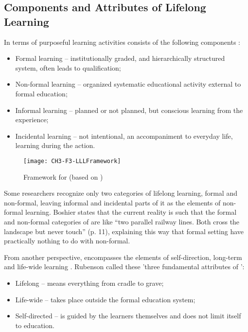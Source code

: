 \subsection{Components and Attributes of Lifelong Learning}
In terms of purposeful learning activities \LLLs consists of the following
components \citep{Longworth2003, Tuijnman2002}:

\begin{itemize}
  \item Formal learning -- institutionally graded, and hierarchically structured
system, often leads to qualification;
  \item Non-formal learning -- organized systematic educational activity
  external to formal education;
  \item Informal learning -- planned or not planned, but conscious learning from
the experience;
  \item Incidental learning -- not intentional, an accompaniment to everyday
  life, learning during the action.
\end{itemize} 

\begin{figure}[htb]
\centering
\texttt{[image: CH3-F3-LLLFramework]}
\caption[Framework for \LLLc]{Framework for \LLLc (based on
\citet[p.~11]{Divjak2004})}
\label{fig:lllfmwrk}
\end{figure}

Some researchers \citep{Longworth2003} recognize only two categories of lifelong
learning, formal and non-formal, leaving informal and incidental parts of it as
the elements of non-formal learning. Boshier \citeyearpar{Boshier2000} states
that the current reality is such that the formal and non-formal categories of
\LLLs are like ``two parallel railway lines. Both cross the landscape but never
touch'' (p. 11), explaining this way that formal setting have practically
nothing to do with non-formal.

From another perspective, \LLLs encompasses the elements of self-direction,
long-term and life-wide learning \citep{Schuetze2006}. Rubenson
\citeyearpar{Rubenson2002} called these 'three fundamental attributes of \LLLs':

\begin{itemize}
  \item Lifelong -- means everything from cradle to grave;
  \item Life-wide -- takes place outside the formal education system;
  \item Self-directed -- is guided by the learners themselves and does not
  limit itself to education.
\end{itemize} 

